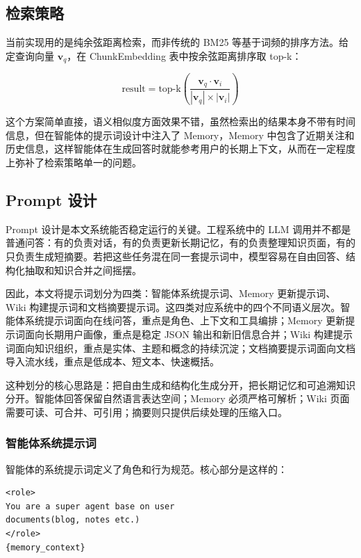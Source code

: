 \subsection{检索策略}

当前实现用的是纯余弦距离检索，而非传统的 BM25\cite{robertson2009bm25} 等基于词频的排序方法。给定查询向量 $\mathbf{v}_q$，在 ChunkEmbedding 表中按余弦距离排序取 top-k：

\begin{equation}
  \text{result} = \text{top-k}\left(\frac{\mathbf{v}_q \cdot \mathbf{v}_i}{|\mathbf{v}_q| \times |\mathbf{v}_i|}\right)
  \label{eq:cosine_similarity}
\end{equation}

这个方案简单直接，语义相似度方面效果不错，虽然检索出的结果本身不带有时间信息，但在智能体的提示词设计中注入了 Memory，Memory 中包含了近期关注和历史信息，这样智能体在生成回答时就能参考用户的长期上下文，从而在一定程度上弥补了检索策略单一的问题。

\subsection{Prompt 设计}

Prompt 设计是本文系统能否稳定运行的关键。工程系统中的 LLM 调用并不都是普通问答：有的负责对话，有的负责更新长期记忆，有的负责整理知识页面，有的只负责生成短摘要。若把这些任务混在同一套提示词中，模型容易在自由回答、结构化抽取和知识合并之间摇摆。

因此，本文将提示词划分为四类：智能体系统提示词、Memory 更新提示词、Wiki 构建提示词和文档摘要提示词。这四类对应系统中的四个不同语义层次。智能体系统提示词面向在线问答，重点是角色、上下文和工具编排；Memory 更新提示词面向长期用户画像，重点是稳定 JSON 输出和新旧信息合并；Wiki 构建提示词面向知识组织，重点是实体、主题和概念的持续沉淀；文档摘要提示词面向文档导入流水线，重点是低成本、短文本、快速概括。

这种划分的核心思路是：把自由生成和结构化生成分开，把长期记忆和可追溯知识分开。智能体回答保留自然语言表达空间；Memory 必须严格可解析；Wiki 页面需要可读、可合并、可引用；摘要则只提供后续处理的压缩入口。

\subsubsection{智能体系统提示词}

智能体的系统提示词定义了角色和行为规范。核心部分是这样的：

\begin{samepage}
\begin{lstlisting}[style=mtcode,captionpos=t,caption={智能体系统提示词核心片段}]
<role>
You are a super agent base on user
documents(blog, notes etc.)
</role>
{memory_context}
\end{lstlisting}
\end{samepage}

